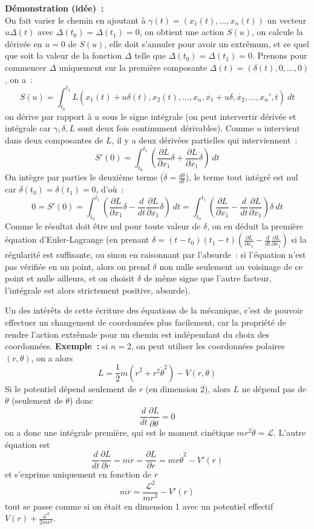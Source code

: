 \documentclass[a4paper,11pt]{book}
\begin{document}
\begin{giacjshere}
{\bf D\'emonstration (id\'ee)~:}\\
On fait varier le chemin en ajoutant \`a 
$\gamma(t)=(x_1(t),...,x_n(t))$
un vecteur $u \Delta(t)$ avec $\Delta(t_0)=\Delta(t_1)=0$, on obtient
une action $S(u)$, on calcule la d\'eriv\'ee en $u=0$
de $S(u)$, elle doit s'annuler pour avoir un extr\^emum, et
ce quel que soit la valeur de la fonction $\Delta$ 
telle que $\Delta(t_0)=\Delta(t_1)=0$. Prenons pour commencer $\Delta$
uniquement sur la premi\`ere composante
$\Delta(t)=(\delta(t),0,...,0)$, on a~:
$$ S(u) = \int_{t_0}^{t_1}
L(x_1(t)+u\delta(t),x_2(t),...,x_n,\dot{x_1}+u\dot{\delta},\dot{x_2},...,x_n',t)  \ dt$$
on d\'erive par rapport \`a $u$ sous le signe int\'egrale (on peut
intervertir d\'eriv\'ee et int\'egrale car $\gamma, \delta, L$ sont
deux fois continument d\'erivables). Comme $u$ intervient dans deux
composantes de $L$, il y a deux d\'eriv\'ees partielles qui
interviennent~:
$$ S'(0) =\int_{t_0}^{t_1} \left(\frac{\partial L}{\partial x_1} \delta + 
\frac{\partial L}{\partial \dot{x_1}} \dot{\delta} \right) \ dt$$
On int\`egre par parties le deuxi\`eme terme ($\dot{\delta}=\frac{d
  \delta}{dt}$), le terme tout int\'egr\'e est nul 
car $\delta(t_0)=\delta(t_1)=0$, d'o\`u~:
$$ 0=S'(0)=\int_{t_0}^{t_1} \left( \frac{\partial L}{\partial x_1} \delta 
-\frac{d}{dt} \frac{\partial L}{\partial \dot{x_1}} \delta \right) \ 
dt
=\int_{t_0}^{t_1} \left( \frac{\partial L}{\partial x_1} 
-\frac{d}{dt} \frac{\partial L}{\partial \dot{x_1}} \right) \delta \ 
dt$$
Comme le r\'esultat doit \^etre nul
pour toute valeur de $\delta$, on en d\'eduit la premi\`ere
\'equation d'Euler-Lagrange (en prenant
$\delta=(t-t_0)(t_1-t) (\frac{\partial L}{\partial x_1} 
-\frac{d}{dt} \frac{\partial L}{\partial \dot{x_1}})$ si la r\'egularit\'e
est suffisante, ou sinon en raisonnant par l'absurde~:
si l'\'equation n'est pas v\'erifi\'ee
en un point, alors on prend $\delta$ non nulle seulement
au voisinage de ce point et nulle ailleurs, et on choisit $\delta$
de m\^eme signe que l'autre facteur, l'int\'egrale est alors
strictement positive, absurde).

Un des int\'er\^ets de cette \'ecriture des \'equations de la
m\'ecanique, c'est de pouvoir effectuer un changement de coordonn\'ees
plus facilement, car la propri\'et\'e de rendre l'action extr\^emale pour un
chemin est ind\'ependant du choix des coordonn\'ees.
{\bf Exemple~:} si $n=2$, on peut utiliser les coordonn\'ees polaires 
$(r,\theta)$, on a alors
$$ L=\frac{1}{2}m(\dot{r}^2+r^2 \dot{\theta}^2) - V(r,\theta)$$
Si le potentiel d\'epend seulement de $r$ (en dimension 2), alors $L$ ne
d\'epend pas de $\theta$ (seulement de $\dot{\theta}$) donc
$$ \frac{d}{dt} \frac{\partial L}{\partial \dot{\theta}} = 0$$
on a donc une int\'egrale premi\`ere, qui est le moment cin\'etique
$mr^2 \dot{\theta}=\mathcal{L}$. L'autre \'equation est
$$ \frac{d}{dt} \frac{\partial L}{\partial \dot{r}} = m\ddot{r}
= \frac{\partial L}{\partial r} = m r \dot{\theta}^2 - V'(r)$$
et s'exprime uniquement en fonction de $r$
$$ m\ddot{r} = \frac{\mathcal{L}^2}{mr^3} - V'(r)$$
tout se passe comme si on \'etait en dimension 1 avec un potentiel
effectif $V(r)+ \frac{\mathcal{L}^2}{2mr^2}$.


\end{giacjshere}
\end{document}
